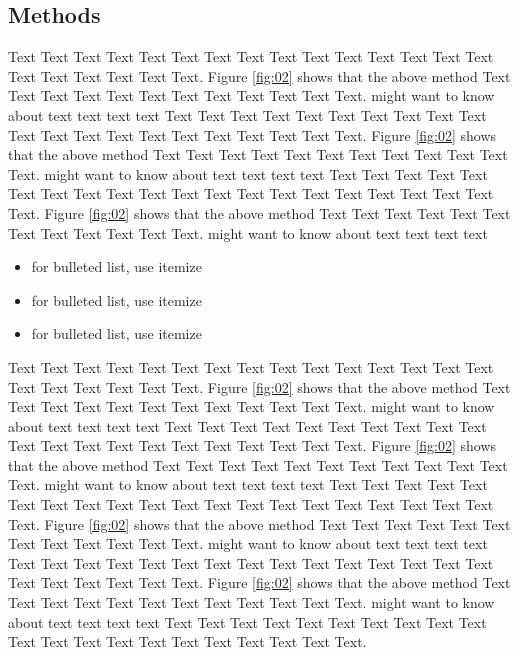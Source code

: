 \documentclass{bioinfo}
\begin{document}
\begin{methods}
\section{Methods}

Text Text Text Text Text Text  Text Text Text Text Text Text Text Text Text  Text Text Text Text Text Text. Figure \ref{fig:02} shows that the above method  Text Text Text Text  Text Text Text Text Text Text  Text Text.  \citealp{Boffelli03} might want to know about  text text text text
Text Text Text Text Text Text  Text Text Text Text Text Text Text Text Text  Text Text Text Text Text Text. Figure \ref{fig:02} shows that the above method  Text Text Text Text  Text Text Text Text Text Text  Text Text.  \citealp{Boffelli03} might want to know about  text text text text
Text Text Text Text Text Text  Text Text Text Text Text Text Text Text Text  Text Text Text Text Text Text. Figure \ref{fig:02} shows that the above method  Text Text Text Text  Text Text Text Text Text Text  Text Text.  \citealp{Boffelli03} might want to know about  text text text text

\begin{itemize}
\item for bulleted list, use itemize
\item for bulleted list, use itemize
\item for bulleted list, use itemize
\end{itemize}



Text Text Text Text Text Text  Text Text Text Text Text Text Text Text Text  Text Text Text Text Text Text. Figure \ref{fig:02} shows that the above method  Text Text Text Text  Text Text Text Text Text Text  Text Text.  \citealp{Boffelli03} might want to know about  text text text text
Text Text Text Text Text Text  Text Text Text Text Text Text Text Text Text  Text Text Text Text Text Text. Figure \ref{fig:02} shows that the above method  Text Text Text Text  Text Text Text Text Text Text  Text Text.  \citealp{Boffelli03} might want to know about  text text text text
Text Text Text Text Text Text  Text Text Text Text Text Text Text Text Text  Text Text Text Text Text Text. Figure \ref{fig:02} shows that the above method  Text Text Text Text  Text Text Text Text Text Text  Text Text.  \citealp{Boffelli03} might want to know about  text text text text
Text Text Text Text Text Text  Text Text Text Text Text Text Text Text Text  Text Text Text Text Text Text. Figure \ref{fig:02} shows that the above method  Text Text Text Text  Text Text Text Text Text Text  Text Text.  \citealp{Boffelli03} might want to know about  text text text text
Text Text Text Text Text Text  Text Text Text Text Text Text Text Text Text  Text Text Text Text Text Text.



\end{methods}
\end{document}
